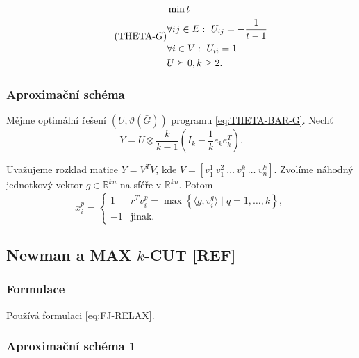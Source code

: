 \begin{equation}\tag{THETA-$\bar{G}$}
    \begin{split}
        &\min t \\
        &\forall ij \in E:\ U_{ij} = -\frac{1}{t - 1} \\
        &\forall i \in V:\ U_{ii} = 1 \\
        &U \succeq 0, k \geq 2.
    \end{split}
    \label{eq:THETA-BAR-G}
\end{equation}

\subsubsection*{Aproximační schéma}

Mějme optimální řešení $(U, \vartheta(\bar{G}))$ programu \ref{eq:THETA-BAR-G}. Nechť
\begin{equation}
    Y = U \otimes \frac{k}{k - 1} \left( I_k - \frac{1}{k} e_k e_k^T \right).
\end{equation}

Uvažujeme rozklad matice $Y = V^T V$, kde $V = \left[ v_1^1\ v_1^2\ \dots\ v_1^k\ \dots\ v_n^k \right]$. Zvolíme náhodný jednotkový vektor $g \in \mathbb{R}^{kn}$ na sféře v $\mathbb{R}^{kn}$. Potom
$$
    x_i^p = 
    \begin{cases}
        1  & r^T v_i^p = \max \left\{ \langle g, v_i^q \rangle \mid q = 1, \dots, k \right\}, \\
        -1 & \text{jinak.}
    \end{cases}
$$


\subsection{Newman a MAX $k$-CUT \textbf{[REF]}}

\subsubsection*{Formulace}

Používá formulaci \ref{eq:FJ-RELAX}.

\subsubsection*{Aproximační schéma 1}


